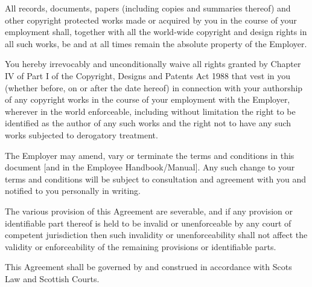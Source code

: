 \documentclass[a4paper,11pt,onecolumn ]{article}
\begin{document}
\begin{legal}
\item {}
\begin{legal}
\item All records, documents, papers (including copies and summaries thereof) and
other copyright protected works made or acquired by you in the course of
your employment shall, together with all the world-wide copyright and design
rights in all such works, be and at all times remain the absolute property of
the Employer.
\item You hereby irrevocably and unconditionally waive all rights granted by
Chapter IV of Part I of the Copyright, Designs and Patents Act 1988 that vest in
you (whether before, on or after the date hereof) in connection with your
authorship of any copyright works in the course of your employment with the
Employer, wherever in the world enforceable, including without limitation the
right to be identified as the author of any such works and the right not to have
any such works subjected to derogatory treatment.
\end{legal}

\item {}
The Employer may amend, vary or terminate the terms and conditions in this
document [and in the Employee Handbook/Manual]. Any such change to your
terms and conditions will be subject to consultation and agreement with you and
notified to you personally in writing.

\item {}
The various provision of this Agreement are severable, and if any provision or
identifiable part thereof is held to be invalid or unenforceable by any court of
competent jurisdiction then such invalidity or unenforceability shall not affect the
validity or enforceability of the remaining provisions or identifiable parts.

\item {}
This Agreement shall be governed by and construed in accordance with Scots Law
and Scottish Courts.
\end{legal}

\newpage
\end{document}

